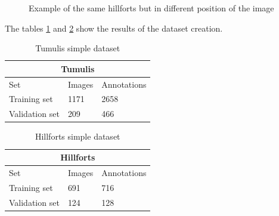 \begin{figure}[H]
    \centering
    \qquad
    \caption{Example of the same hillforts but in different position of the image}%
\end{figure}

The tables \ref{table:tumulissimpledataset} and \ref{table:hillfortssimpledataset} show the results of the dataset creation.

\begin{table}[H]
\centering
\begin{tabular}{|p{3cm}|p{2.5cm}|p{2cm}|} 
\hline
\multicolumn{3}{|c|}{Tumulis} \\
 \hline
  Set & Images & Annotations\\ [0.5ex] 
 \hline
 Training set & 1171 & 2658 \\ 
 Validation set & 209 & 466  \\[1ex]
 \hline
\end{tabular}
\caption{Tumulis simple dataset}
\label{table:tumulissimpledataset}
\end{table} 

\begin{table}[H]
\centering
\begin{tabular}{|p{3cm}|p{2.5cm}|p{2cm}|} 
\hline
\multicolumn{3}{|c|}{Hillforts} \\
 \hline
  Set & Images & Annotations\\ [0.5ex] 
 \hline
 Training set & 691 & 716 \\ 
 Validation set & 124 & 128  \\[1ex]
 \hline
\end{tabular}
\caption{Hillforts simple dataset}
\label{table:hillfortssimpledataset}
\end{table} 